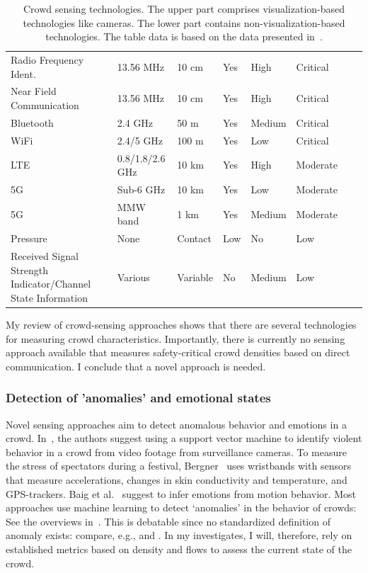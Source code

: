 \begin{table}[hbt!]
\begin{footnotesize}
\begin{tabular}{p{45mm}p{25mm}p{10mm}p{12mm}p{10mm}p{10mm}p{10mm}p{10mm}}
        Radio Frequency Ident. & 13.56 MHz & 10 cm  & Yes & High & Critical \\
        Near Field Communication & 13.56 MHz & 10 cm  & Yes & High  & Critical  \\
        Bluetooth & 2.4 GHz & 50 m  & Yes & Medium  & Critical  \\
        WiFi & 2.4/5 GHz & 100 m  & Yes & Low & Critical \\
        LTE & 0.8/1.8/2.6 GHz & 10 km  & Yes  & High & Moderate \\
        5G & Sub-6 GHz & 10 km  & Yes & Low & Moderate  \\
        5G & MMW band & 1 km  & Yes & Medium & Moderate  \\
        Pressure & None & Contact  & Low & No   & Low  \\
        Received Signal Strength Indicator/Channel State Information  & Various & Variable  & No & Medium &  Low \\
        \hline
\end{tabular}
\end{footnotesize}
    \caption{Crowd sensing technologies. The upper part comprises visualization-based technologies like cameras. The lower part contains non-visualization-based technologies. The table data is based on the data presented in~\cite{darsena-2023-cdyn}.}
    \label{tab:technology_data}
\end{table}

My review of crowd-sensing approaches shows that there are several technologies for measuring crowd characteristics. 
Importantly, there is currently no sensing approach available that measures safety-critical crowd densities based on direct communication. I conclude that a novel approach is needed. 



\subsubsection{Detection of 'anomalies' and emotional states }
Novel sensing approaches aim to detect anomalous behavior and emotions in a crowd.  In~\cite{hassner-2012-cdyn}, the authors suggest using a support vector machine to identify violent behavior in a crowd from video footage from surveillance cameras. To measure the stress of spectators during a festival, Bergner~\cite{bergner-2020-cdyn} uses wristbands with sensors that measure accelerations, changes in skin conductivity and temperature, and GPS-trackers. Baig et al.~\cite{baig-2014-cdyn} suggest to infer emotions from motion behavior. Most approaches use machine learning to detect `anomalies' in the behavior of crowds: See the overviews in~\cite{sinha-2021-cdyn,lamba-2017-cdyn}. This is debatable since no standardized definition of anomaly exists: compare, e.g., \cite{mohammadi-2017-cdyn} and \cite{liu-2019-cdyn}. In my investigates, I will, therefore, rely on established metrics based on density and flows to assess the current state of the crowd.





